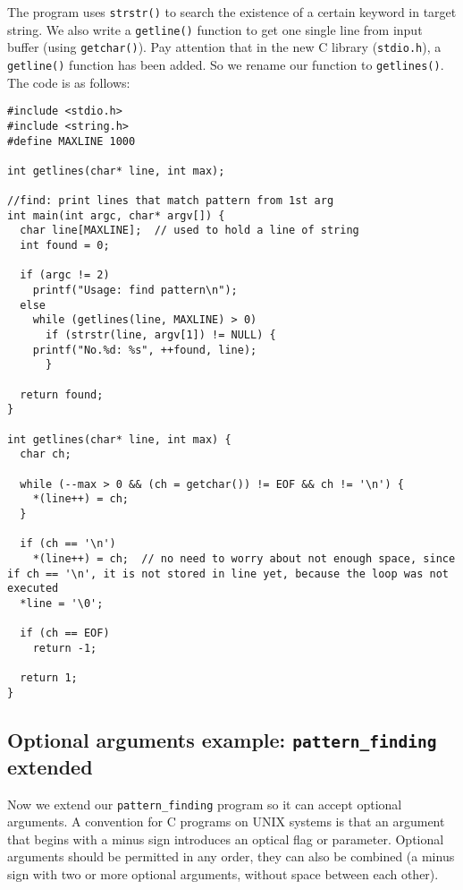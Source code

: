 \documentclass[12pt]{article}
\begin{document}
The program uses \texttt{strstr()} to search the existence of a certain keyword in target string. We also write a \texttt{getline()} function to get one single line from input buffer (using \texttt{getchar()}). Pay attention that in the new C library (\texttt{stdio.h}), a \texttt{getline()} function has been added. So we rename our function to \texttt{getlines()}. The code is as follows:
\begin{verbatim}
#include <stdio.h>
#include <string.h>
#define MAXLINE 1000

int getlines(char* line, int max);

//find: print lines that match pattern from 1st arg 
int main(int argc, char* argv[]) {
  char line[MAXLINE];  // used to hold a line of string
  int found = 0;

  if (argc != 2)
    printf("Usage: find pattern\n");
  else
    while (getlines(line, MAXLINE) > 0)
      if (strstr(line, argv[1]) != NULL) {
	printf("No.%d: %s", ++found, line);
      }

  return found;
}

int getlines(char* line, int max) {
  char ch;

  while (--max > 0 && (ch = getchar()) != EOF && ch != '\n') {
    *(line++) = ch;
  }

  if (ch == '\n')
    *(line++) = ch;  // no need to worry about not enough space, since if ch == '\n', it is not stored in line yet, because the loop was not executed
  *line = '\0';

  if (ch == EOF)
    return -1;

  return 1;
}
\end{verbatim}

\subsection{Optional arguments example: \texttt{pattern\_finding} extended}
\label{sec:org9b8afc6}
Now we extend our \texttt{pattern\_finding} program so it can accept optional arguments. A convention for C programs on UNIX systems is that an argument that begins with a minus sign introduces an optical flag or parameter. Optional arguments should be permitted in any order, they can also be combined (a minus sign with two or more optional arguments, without space between each other).
\end{document}
